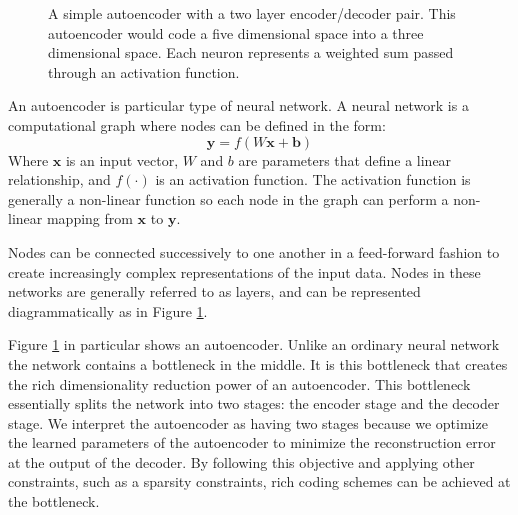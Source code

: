\begin{figure}
\centering

\caption{
A simple autoencoder with a two layer encoder/decoder pair. This autoencoder
would code a five dimensional space into a three dimensional space. Each neuron represents a weighted sum passed through an activation function.
}
\label{autoenc}
\end{figure}

An autoencoder is particular type of neural network. A neural network is a computational graph where nodes can be
defined in the form: 
\begin{equation}
\mathbf{y} = f\left(W\mathbf{x} + \mathbf{b}\right)
\label{dense}
\end{equation}
Where $\mathbf{x}$ is an input vector, $W$ and $b$ are parameters that define a
linear relationship, and $f(\cdot)$ is an activation function. The activation
function is generally a non-linear function so each node in the graph can
perform a non-linear mapping from $\mathbf{x}$ to $\mathbf{y}$.

Nodes can be connected successively to one another in a feed-forward fashion to
create increasingly complex representations of the input data. Nodes in these
networks are generally referred to as layers, and can be represented
diagrammatically as in Figure \ref{autoenc}. 

Figure \ref{autoenc} in particular shows an autoencoder. Unlike an ordinary
neural network the network contains a bottleneck in the middle. It is this
bottleneck that creates the rich dimensionality reduction power of an
autoencoder. This bottleneck essentially splits the network into two stages:
the encoder stage and the decoder stage. We interpret the autoencoder as
having two stages because we optimize the learned parameters of the
autoencoder to minimize the reconstruction error at the output of the decoder.
By following this objective and applying other constraints, such as a sparsity constraints, rich coding schemes can be achieved at the bottleneck.
